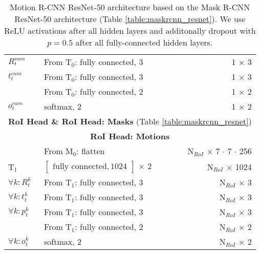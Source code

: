 {\begin{table}[h]
\begin{tabular}{llr}
$R_t^{cam}$& From T$_0$: fully connected, 3 & 1 $\times$ 3 \\
$t_t^{cam}$& From T$_0$: fully connected, 3 & 1 $\times$ 3 \\
& From T$_0$: fully connected, 2 & 1 $\times$ 2 \\
$o_t^{cam}$& softmax, 2 & 1 $\times$ 2 \\
\midrule
\multicolumn{3}{c}{\textbf{RoI Head \& RoI Head: Masks} (Table \ref{table:maskrcnn_resnet})}\\
\midrule
\multicolumn{3}{c}{\textbf{RoI Head: Motions}}\\
\midrule
& From M$_0$: flatten & N$_{RoI}$ $\times$ 7 $\cdot$ 7 $\cdot$ 256 \\
T$_1$ & $\begin{bmatrix}\textrm{fully connected}, 1024\end{bmatrix}$ $\times$ 2 & N$_{RoI}$ $\times$ 1024 \\
$\forall k: R_t^k$ & From T$_1$: fully connected, 3 & N$_{RoI}$ $\times$ 3 \\
$\forall k: t_t^k$ & From T$_1$: fully connected, 3 & N$_{RoI}$ $\times$ 3 \\
$\forall k: p_t^k$ & From T$_1$: fully connected, 3 & N$_{RoI}$ $\times$ 3 \\
& From T$_1$: fully connected, 2 & N$_{RoI}$ $\times$ 2 \\
$\forall k: o_t^k$ & softmax, 2 & N$_{RoI}$ $\times$ 2 \\

\bottomrule
\end{tabular}

\caption {
Motion R-CNN ResNet-50 architecture based on the Mask R-CNN
ResNet-50 architecture (Table \ref{table:maskrcnn_resnet}).
We use ReLU activations after all hidden layers and
additonally dropout with $p = 0.5$ after all fully-connected hidden layers.
}
\label{table:motionrcnn_resnet}
\end{table}
}

